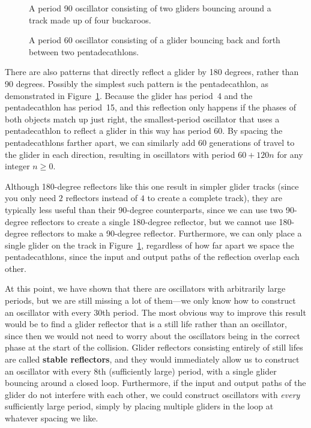 \begin{figure}[!htb]
	\centering
	\begin{minipage}[b]{.45\textwidth}
		\centering{}
		\caption{A period 90 oscillator consisting of two gliders bouncing around a track made up of four buckaroos.}\label{fig:buckaroo_loop}
	\end{minipage} \hfill %
	\begin{minipage}[b]{.51\textwidth}
		\centering{}
		\caption{A period 60 oscillator consisting of a glider bouncing back and forth between two pentadecathlons.}\label{fig:relay}
	\end{minipage}
\end{figure}

There are also patterns that directly reflect a glider by 180 degrees, rather than 90 degrees. Possibly the simplest such pattern is the pentadecathlon, as demonstrated in Figure~\ref{fig:relay}. Because the glider has period~4 and the pentadecathlon has period~15, and this reflection only happens if the phases of both objects match up just right, the smallest-period oscillator that uses a pentadecathlon to reflect a glider in this way has period $60$. By spacing the pentadecathlons farther apart, we can similarly add 60 generations of travel to the glider in each direction, resulting in oscillators with period $60 + 120n$ for any integer $n \geq 0$.

Although 180-degree reflectors like this one result in simpler glider tracks (since you only need $2$ reflectors instead of $4$ to create a complete track), they are typically less useful than their 90-degree counterparts, since we can use two 90-degree reflectors to create a single 180-degree reflector, but we cannot use 180-degree reflectors to make a 90-degree reflector. Furthermore, we can only place a single glider on the track in Figure~\ref{fig:relay}, regardless of how far apart we space the pentadecathlons, since the input and output paths of the reflection overlap each other.

At this point, we have shown that there are oscillators with arbitrarily large periods, but we are still missing a lot of them---we only know how to construct an oscillator with every 30th period. The most obvious way to improve this result would be to find a glider reflector that is a still life rather than an oscillator, since then we would not need to worry about the oscillators being in the correct phase at the start of the collision. Glider reflectors consisting entirely of still lifes are called \textbf{stable reflectors}, and they would immediately allow us to construct an oscillator with every 8th (sufficiently large) period, with a single glider bouncing around a closed loop. Furthermore, if the input and output paths of the glider do not interfere with each other, we could construct oscillators with \emph{every} sufficiently large period, simply by placing multiple gliders in the loop at whatever spacing we like.

